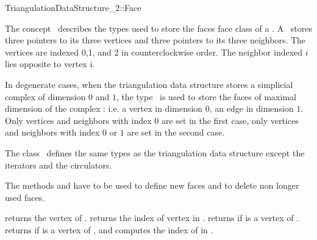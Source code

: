 

\begin{ccRefConcept}{TriangulationDataStructure_2::Face}


\ccDefinition
  
The concept \ccRefName\  describes the types used to store the faces
face class of a 
.
A \ccRefName\ stores three pointers to its three vertices
and three pointers to its three neighbors.
The vertices are indexed 0,1, and 2 in counterclockwise order.
The  neighbor indexed $i$ lies
opposite to vertex i.

In degenerate cases,
when the triangulation data structure  stores a
simplicial complex of dimension $0$ and $1$,
the type \ccRefName\  is used to store the faces 
of maximal dimension of the complex 
: i.e. a vertex in dimension $0$, an edge in dimension $1$.
Only vertices and neighbors with index $0$ are set in the first case,
only vertices and neighbors with index $0$ or $1$ are set in the second case.


\ccTypes
The class \ccRefName\ defines the same types as 
the triangulation data structure 
except the iterators and the circulators.


\ccCreation

The methods  and
have to be used to 
define new faces and  to delete non longer used faces.



{returns  the vertex  of \ccVar.
}
\ccGlue
{}
{returns the index of vertex  in \ccVar. }
\ccGlue
{}
{returns  if   is a vertex of \ccVar.}
\ccGlue
{}
{returns  if   is a vertex of \ccVar, and
 computes the index  of  in .}



\end{ccRefConcept}
